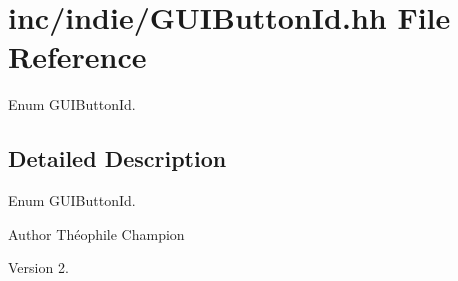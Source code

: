 \hypertarget{GUIButtonId_8hh}{}\section{inc/indie/\+G\+U\+I\+Button\+Id.hh File Reference}
\label{GUIButtonId_8hh}


Enum G\+U\+I\+Button\+Id.  




\subsection{Detailed Description}
Enum G\+U\+I\+Button\+Id. 

\begin{DoxyAuthor}{Author}
Théophile Champion 
\end{DoxyAuthor}
\begin{DoxyVersion}{Version}
2. 
\end{DoxyVersion}
